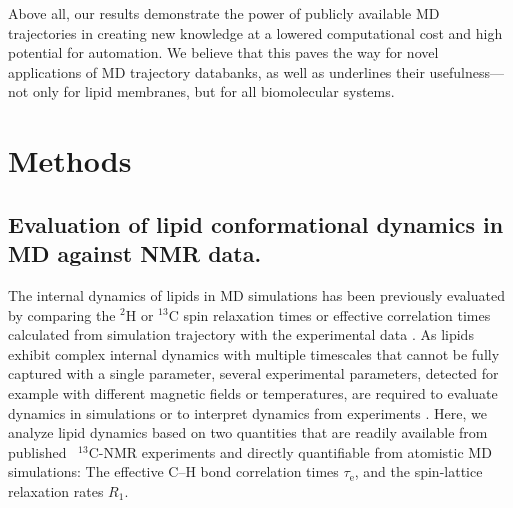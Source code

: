 \documentclass[journal=jcisd8,manuscript=article,layout=twocolumn]{achemso}
\begin{document}
Above all, our results demonstrate the power of publicly available MD trajectories
in creating new knowledge at a lowered computational cost and high potential for automation.  
We believe that this paves the way for novel applications of MD trajectory
databanks, as well as underlines their usefulness---not only for lipid membranes,
but for all biomolecular systems.


\clearpage
\section{Methods}
\subsection*{Evaluation of lipid conformational dynamics in MD against NMR data.}\label{sec:theory}
The internal dynamics of lipids in MD simulations has been previously evaluated by comparing
the $^2$H or $^{13}$C spin relaxation times or effective correlation times calculated from simulation
trajectory with the experimental data \cite{feller02,wohlert06,klauda08,klauda08II,ferreira15,Ollila:2016a}.
As lipids exhibit complex internal dynamics with multiple timescales that cannot be fully captured
with a single parameter, several experimental parameters, detected for example with different
magnetic fields or temperatures, are required to evaluate dynamics in simulations or to interpret dynamics
from experiments \cite{Roberts:2009a,leftin11}.
%
Here, we analyze lipid dynamics based on two quantities that are readily available
from published~\cite{ferreira15,pham15,Volke:1995a,Antila:2020a} $^{13}$C-NMR experiments and
directly quantifiable from atomistic MD simulations:
The effective C--H bond correlation times $\tau_\mathrm{e}$, and
the spin-lattice relaxation rates $R_1$.
\end{document}
